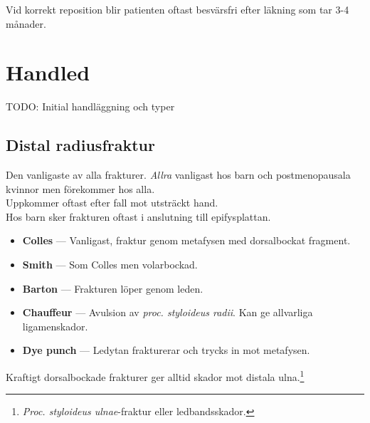 \documentclass[
  letterpaper,
  DIV=11,
  numbers=noendperiod]{scrreport}
\providecommand{\tightlist}{%
  \setlength{\itemsep}{0pt}\setlength{\parskip}{0pt}}\usepackage{longtable,booktabs,array}
\begin{document}
Vid korrekt reposition blir patienten oftast besvärsfri efter läkning
som tar 3-4 månader.

\hypertarget{handled}{%
\section{Handled}\label{handled}}

TODO: Initial handläggning och typer

\hypertarget{distal-radiusfraktur}{%
\subsection{Distal radiusfraktur}\label{distal-radiusfraktur}}

Den vanligaste av alla frakturer. \emph{Allra} vanligast hos barn och
postmenopausala kvinnor men förekommer hos alla.\\
Uppkommer oftast efter fall mot utsträckt hand.\\
Hos barn sker frakturen oftast i anslutning till epifysplattan.

\begin{tcolorbox}[enhanced jigsaw, colback=white, colbacktitle=quarto-callout-tip-color!10!white, toptitle=1mm, arc=.35mm, toprule=.15mm, rightrule=.15mm, titlerule=0mm, breakable, bottomrule=.15mm, colframe=quarto-callout-tip-color-frame, left=2mm, opacityback=0, coltitle=black, title=\textcolor{quarto-callout-tip-color}{\faLightbulb}\hspace{0.5em}{Typer}, leftrule=.75mm, bottomtitle=1mm, opacitybacktitle=0.6]

\begin{itemize}
\tightlist
\item
  \textbf{Colles} --- Vanligast, fraktur genom metafysen med
  dorsalbockat fragment.
\item
  \textbf{Smith} --- Som Colles men volarbockad.
\item
  \textbf{Barton} --- Frakturen löper genom leden.
\item
  \textbf{Chauffeur} --- Avulsion av \emph{proc. styloideus radii}. Kan
  ge allvarliga ligamenskador.
\item
  \textbf{Dye punch} --- Ledytan frakturerar och trycks in mot
  metafysen.
\end{itemize}

\end{tcolorbox}

Kraftigt dorsalbockade frakturer ger alltid skador mot distala
ulna.\footnote{\emph{Proc. styloideus ulnae}-fraktur eller
  ledbandsskador.}
\end{document}
